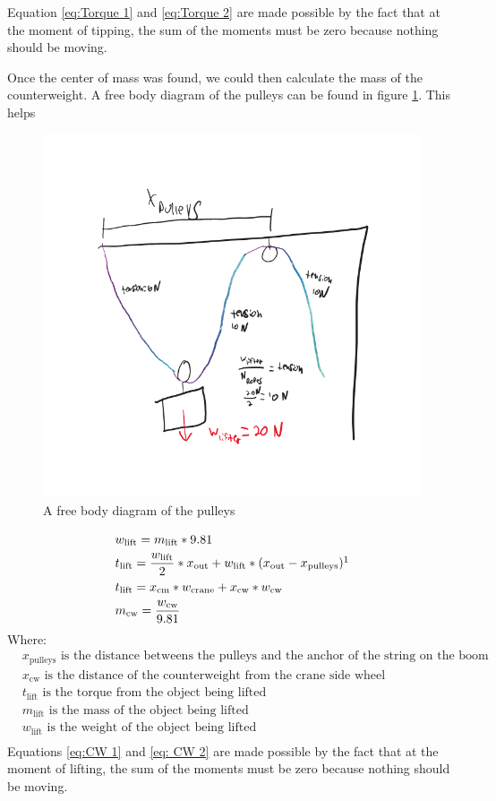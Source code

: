 \documentclass[letterpaper, 12pt]{article}
\begin{document}
Equation \ref{eq:Torque 1} and \ref{eq:Torque 2} are made possible by the fact that at the moment of tipping, the sum of the moments must be zero because nothing should be moving. 

Once the center of mass was found, we could then calculate the mass of the counterweight. A free body diagram of the pulleys can be found in figure \ref{fig:Pulleys}. This helps 
\begin{figure}
    \centering
    \includegraphics[width =0.6\linewidth]{null (2).png}
    \caption{A free body diagram of the pulleys}
    \label{fig:Pulleys}
\end{figure}

\begin{align}
& w_{\text{lift}}=m_{\text{lift}}*9.81 \\
& t_{\text{lift}}= \frac{w_\text{lift}}{2}*x_{\text{out}}+ w_{\text{lift}}*(x_\text{out}-x_{\text{pulleys}}) \footnotemark \label{eq:CW 1} \\ 
& t_{\text{lift}} = x_{\text{cm}} * w_{\text{crane}} + x_{\text{cw}} * w_{\text{cw}} \label{eq: CW 2} \\
& m_{\text{cw}} = \frac{w_{\text{cw}}}{9.81}
\end{align}
Where:
\begin{equation}
 \begin{split}
    & x_{\text{pulleys}}  \text{ is the distance betweens the pulleys and the anchor of the string on the boom } \\
    & x_{\text{cw}}  \text{ is the distance of the counterweight from the crane side wheel} \\
    & t_{\text{lift}} \text{ is the torque from the object being lifted} \\
    & m_{\text{lift}} \text{ is the mass of the object being lifted} \\
    & w_{\text{lift}} \text{ is the weight of the object being lifted} \\
 \end{split}
\end{equation}
Equations \ref{eq:CW 1} and \ref{eq: CW 2} are made possible by the fact that at the moment of lifting, the sum of the moments must be zero because nothing should be moving.
\end{document}
